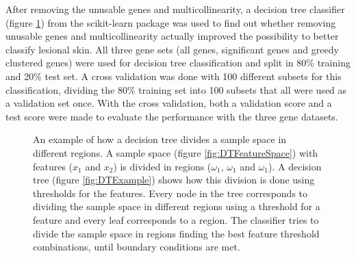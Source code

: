 \documentclass[10pt,a4paper]{article}
\begin{document}
	After removing the unusable genes and multicollinearity, a decision tree classifier (figure \ref{fig:DecisionTree}) from the scikit-learn package was used to find out whether removing unusable genes and multicollinearity actually improved the possibility to better classify lesional skin. All three gene sets (all genes, significant genes and greedy clustered genes) were used for decision tree classification and split in 80\% training and 20\% test set. A cross validation was done with 100 different subsets for this classification, dividing the 80\% training set into 100 subsets that all were used as a validation set once. With the cross validation, both a validation score and a test score were made to evaluate the performance with the three gene datasets.
	
		\begin{figure}[H]
		\centering
		\hfill
		\caption{An example of how a decision tree divides a sample space in different regions. A sample space (figure \ref{fig:DTFeatureSpace}) with features ($x_1$ and $x_2$) is divided in regions ($\omega_1$, $\omega_1$ and $\omega_1$). A decision tree (figure \ref{fig:DTExample}) shows how this division is done using thresholds for the features. Every node in the tree corresponds to dividing the sample space in different regions using a threshold for a feature and every leaf corresponds to a region. The classifier tries to divide the sample space in regions finding the best feature threshold combinations, until boundary conditions are met.}
		\label{fig:DecisionTree}
	\end{figure}
	
\end{document}
